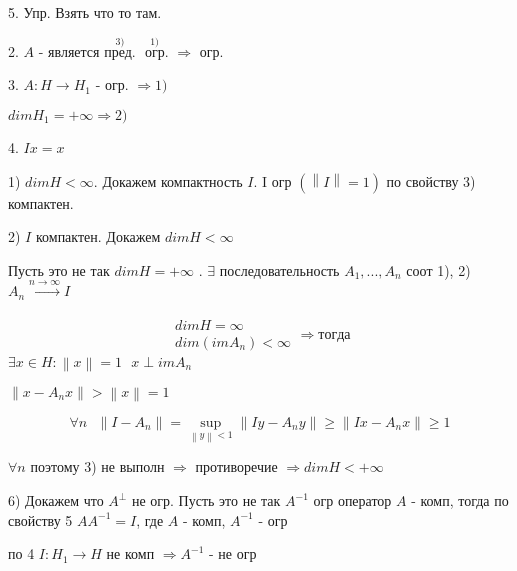 \documentclass[12pt, a4paper]{report}
\begin{document}
5. Упр. Взять что то там. 

2. \( A \) - является \( \overset{3)}{\text{пред.}}  \) \(\overset{1)}{\text{ огр.}}  \)  \( \Rightarrow  \) огр. 

3. \( A : H \to  H_1 \) - огр. \( \Rightarrow 1) \) 

\( dim H_1  = + \infty  \Rightarrow 2) \) 

4. \( Ix = x  \) 

1) \( dim H < \infty   \). Докажем компактность \( I \). I огр \( (\left\lVert I  \right\rVert =1 ) \)  по свойству 3) компактен. 

2) \( I \)  компактен. Докажем \( dim H < \infty  \) 

Пусть это не так \( dim H = + \infty  \) . \( \exists  \) последовательность \( A_1 ,..., A_n \) соот 1), 2) \( A_n \xrightarrow{ n \to  \infty  } I   \) 

\[ \begin{aligned}
\begin{aligned}
dim H = \infty  \\ 
dim (im A_n ) < \infty 
\end{aligned}
\Rightarrow тогда
\end{aligned} \] 
\( \exists  x \in  H : \left\lVert x \right\rVert =1 \text{ }  x \perp  im A_n\) 

\( \left\lVert x - A_n x  \right\rVert > \left\lVert x  \right\rVert = 1  \) 

\[ \forall  n \text{ }  \left\lVert  I - A_n  \right\rVert = \sup _{\left\lVert y  \right\rVert < 1} \left\lVert I y - A_n y  \right\rVert \ge  \left\lVert I x - A_n x  \right\rVert \ge  1  \] 

\( \forall  n  \) поэтому 3) не выполн \( \Rightarrow  \) противоречие \( \Rightarrow  dim H < + \infty \) 

6) Докажем что \( A^{ \perp }  \) не огр. Пусть это не так \( A^{-1}  \) огр оператор \( A \) - комп, тогда по свойству 5 \( A A^{-1} = I  \), где \( A  \) - комп, \( A^{-1}  \) - огр 

по 4 \( I : H_1 \to  H  \) не комп \( \Rightarrow  A^{-1 }  \) - не огр





\ifdefined\mainfile
\else
    
\end{document}
